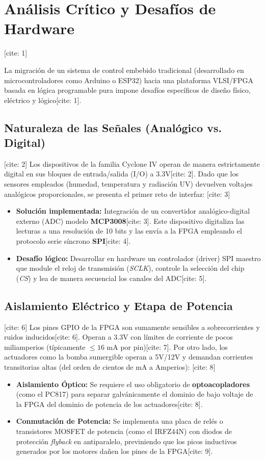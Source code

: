 \section{Análisis Crítico y Desafíos de Hardware} [cite: 1]

La migración de un sistema de control embebido tradicional (desarrollado en microcontroladores como Arduino o ESP32) hacia una plataforma VLSI/FPGA basada en lógica programable pura impone desafíos específicos de diseño físico, eléctrico y lógico[cite: 1].

\subsection{Naturaleza de las Señales (Analógico vs. Digital)} [cite: 2]
Los dispositivos de la familia Cyclone IV operan de manera estrictamente digital en sus bloques de entrada/salida (I/O) a 3.3V[cite: 2]. Dado que los sensores empleados (humedad, temperatura y radiación UV) devuelven voltajes analógicos proporcionales, se presenta el primer reto de interfaz: [cite: 3]
\begin{itemize}
	\item \textbf{Solución implementada:} Integración de un convertidor analógico-digital externo (ADC) modelo \textbf{MCP3008}[cite: 3]. Este dispositivo digitaliza las lecturas a una resolución de 10 bits y las envía a la FPGA empleando el protocolo serie síncrono \textbf{SPI}[cite: 4].
	\item \textbf{Desafío lógico:} Desarrollar en hardware un controlador (driver) SPI maestro que module el reloj de transmisión (\textit{SCLK}), controle la selección del chip (\textit{CS}) y lea de manera secuencial los canales del ADC[cite: 5].
\end{itemize}

\subsection{Aislamiento Eléctrico y Etapa de Potencia} [cite: 6]
Los pines GPIO de la FPGA son sumamente sensibles a sobrecorrientes y ruidos inducidos[cite: 6]. Operan a 3.3V con límites de corriente de pocos miliamperios (típicamente $\le 16$ mA por pin)[cite: 7]. Por otro lado, los actuadores como la bomba sumergible operan a 5V/12V y demandan corrientes transitorias altas (del orden de cientos de mA a Amperios): [cite: 8]
\begin{itemize}
	\item \textbf{Aislamiento Óptico:} Se requiere el uso obligatorio de \textbf{optoacopladores} (como el PC817) para separar galvánicamente el dominio de bajo voltaje de la FPGA del dominio de potencia de los actuadores[cite: 8].
	\item \textbf{Conmutación de Potencia:} Se implementa una placa de relés o transistores MOSFET de potencia (como el IRFZ44N) con diodos de protección \textit{flyback} en antiparalelo, previniendo que los picos inductivos generados por los motores dañen los pines de la FPGA[cite: 9].
\end{itemize}

